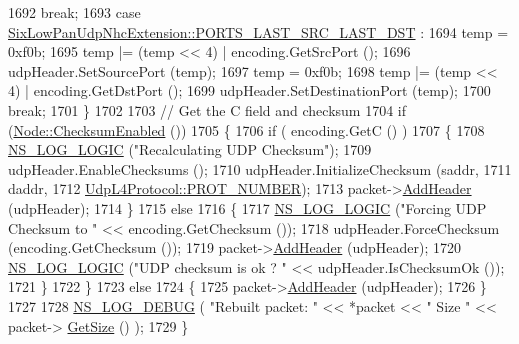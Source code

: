 \begin{DoxyCode}
1692       \textcolor{keywordflow}{break};
1693     \textcolor{keywordflow}{case} \hyperlink{classns3_1_1SixLowPanUdpNhcExtension_a77005f9c06de72b1a6ea105a23bf413baef8af6ce660592f4b15a9953fdb94020}{SixLowPanUdpNhcExtension::PORTS\_LAST\_SRC\_LAST\_DST}
      :
1694       temp = 0xf0b;
1695       temp |= (temp << 4) | encoding.GetSrcPort ();
1696       udpHeader.SetSourcePort (temp);
1697       temp = 0xf0b;
1698       temp |= (temp << 4) | encoding.GetDstPort ();
1699       udpHeader.SetDestinationPort (temp);
1700       \textcolor{keywordflow}{break};
1701     \}
1702 
1703   \textcolor{comment}{// Get the C field and checksum}
1704   \textcolor{keywordflow}{if} (\hyperlink{classns3_1_1Node_a0515bfe9a3aeb6605d657ba855699815}{Node::ChecksumEnabled} ())
1705     \{
1706       \textcolor{keywordflow}{if} ( encoding.GetC () )
1707         \{
1708           \hyperlink{group__logging_ga88acd260151caf2db9c0fc84997f45ce}{NS\_LOG\_LOGIC} (\textcolor{stringliteral}{"Recalculating UDP Checksum"});
1709           udpHeader.EnableChecksums ();
1710           udpHeader.InitializeChecksum (saddr,
1711                                         daddr,
1712                                         \hyperlink{classns3_1_1UdpL4Protocol_ad370801b3d1a166e831020a777c41047}{UdpL4Protocol::PROT\_NUMBER});
1713           packet->\hyperlink{classns3_1_1Packet_a465108c595a0bc592095cbcab1832ed8}{AddHeader} (udpHeader);
1714         \}
1715       \textcolor{keywordflow}{else}
1716         \{
1717           \hyperlink{group__logging_ga88acd260151caf2db9c0fc84997f45ce}{NS\_LOG\_LOGIC} (\textcolor{stringliteral}{"Forcing UDP Checksum to "} << encoding.GetChecksum ());
1718           udpHeader.ForceChecksum (encoding.GetChecksum ());
1719           packet->\hyperlink{classns3_1_1Packet_a465108c595a0bc592095cbcab1832ed8}{AddHeader} (udpHeader);
1720           \hyperlink{group__logging_ga88acd260151caf2db9c0fc84997f45ce}{NS\_LOG\_LOGIC} (\textcolor{stringliteral}{"UDP checksum is ok ? "} << udpHeader.IsChecksumOk ());
1721         \}
1722     \}
1723   \textcolor{keywordflow}{else}
1724     \{
1725       packet->\hyperlink{classns3_1_1Packet_a465108c595a0bc592095cbcab1832ed8}{AddHeader} (udpHeader);
1726     \}
1727 
1728   \hyperlink{group__logging_ga413f1886406d49f59a6a0a89b77b4d0a}{NS\_LOG\_DEBUG} ( \textcolor{stringliteral}{"Rebuilt packet: "} << *packet << \textcolor{stringliteral}{" Size "} << packet->
      \hyperlink{classns3_1_1Packet_a462855c9929954d4301a4edfe55f4f1c}{GetSize} () );
1729 \}
\end{DoxyCode}



